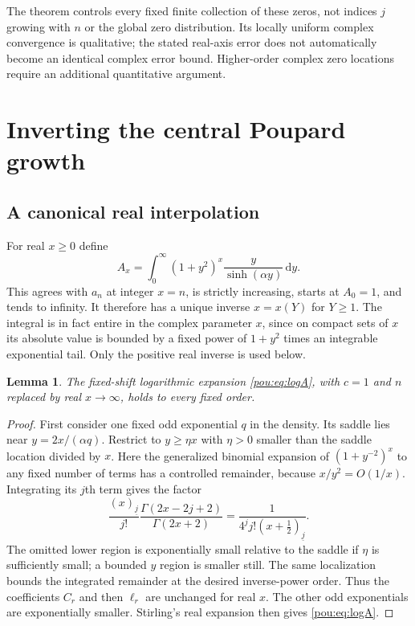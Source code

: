 \documentclass[11pt]{article}
\newtheorem{lemma}[theorem]{Lemma}
\theoremstyle{definition}
\theoremstyle{remark}
\newcommand{\dd}{\,\mathrm d}
\newcommand{\fall}[2]{(#1)_{\underline{#2}}}
\begin{document}
The theorem controls every fixed finite collection of these zeros, not
indices $j$ growing with $n$ or the global zero distribution.
Its locally uniform complex convergence is qualitative; the stated
real-axis error does not automatically become an identical complex error
bound.  Higher-order complex zero locations require an additional
quantitative argument.

\section{Inverting the central Poupard growth}\label{pou:sec:inverse}

\subsection{A canonical real interpolation}

For real $x\ge0$ define
\begin{equation}\label{pou:eq:realinterp}
 A_x=\int_0^\infty(1+y^2)^x\frac{y}{\sinh(\alpha y)}\dd y.
\end{equation}
This agrees with $a_n$ at integer $x=n$, is strictly increasing, starts
at $A_0=1$, and tends to infinity.  It therefore has a unique inverse
$x=x(Y)$ for $Y\ge1$.
The integral is in fact entire in the complex parameter $x$, since on
compact sets of $x$ its absolute value is bounded by a fixed power of
$1+y^2$ times an integrable exponential tail.  Only the positive real
inverse is used below.

\begin{lemma}\label{pou:lem:realexp}
The fixed-shift logarithmic expansion \eqref{pou:eq:logA}, with $c=1$ and
$n$ replaced by real $x\to\infty$, holds to every fixed order.
\end{lemma}
\begin{proof}
First consider one fixed odd exponential $q$ in the density.
Its saddle lies near $y=2x/(\alpha q)$.  Restrict to $y\ge\eta x$ with
$\eta>0$ smaller than the saddle location divided by $x$.
Here the generalized binomial expansion of
$(1+y^{-2})^x$ to any fixed number of terms has a controlled remainder,
because $x/y^2=O(1/x)$.  Integrating its $j$th term gives the factor
\[
 \frac{\fall xj}{j!}
 \frac{\Gamma(2x-2j+2)}{\Gamma(2x+2)}
 =\frac1{4^j j!\fall{x+\tfrac12}{j}}.
\]
The omitted lower region is exponentially small relative to the saddle
if $\eta$ is sufficiently small; a bounded $y$ region is smaller still.
The same localization bounds the integrated remainder at the desired
inverse-power order.  Thus the coefficients $C_r$ and then $\ell_r$
are unchanged for real $x$.  The other odd exponentials are exponentially
smaller.  Stirling's real expansion then gives \eqref{pou:eq:logA}.
\end{proof}
\end{document}

